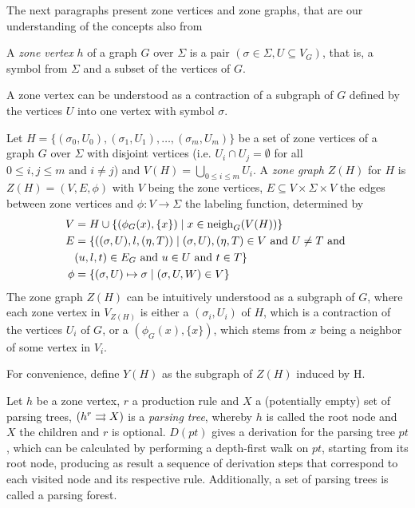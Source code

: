 The next paragraphs present zone vertices and zone graphs, that are our understanding of the concepts also from %

\begin{definition}
	\label{def:zv}
	A \emph{zone vertex} $h$ of a graph $G$ over $\Sigma$ is a pair $(\sigma \in \Sigma, U \subseteq V_G)$, that is, a symbol from $\Sigma$ and a subset of the vertices of $G$.
	
	A zone vertex can be understood as a contraction of a subgraph of $G$ defined by the vertices $U$ into one vertex with symbol $\sigma$.
\end{definition}

\begin{definition}
	\label{def:z}
	Let $H = \{(\sigma_0,U_0),(\sigma_1,U_1),\dots,(\sigma_m,U_m)\}$ be a set of zone vertices of a graph $G$ over $\Sigma$ with disjoint vertices (i.e. $U_i \cap U_j = \emptyset$ for all $0 \leq i,j \leq m \text{ and } i \neq j$) and $V(H) = \bigcup_{0 \leq i \leq m}{U_i}$. A \emph{zone graph} $Z(H)$ for $H$ is $Z(H) = (V, E, \phi)$ with $V$ being the zone vertices, $E \subseteq V \times \Sigma \times V$ the edges between zone vertices and $\phi: V \to \Sigma$ the labeling function, determined by
	\begin{align*}
		V & = H \cup \{(\phi_G(x),\{x\}) \; | \; x \in \operatorname{neigh}_{G}(V(H)) \}\\
		E & = \{((\sigma,U),l,(\eta,T)) \; | \; (\sigma,U),(\eta,T) \in V \text{ and } U \neq T \text{ and } \\
		& (u,l,t) \in E_G \text{ and } u \in U \text{ and } t \in T\} \\
		\phi & = \{(\sigma,U) \mapsto \sigma  \; | \; (\sigma,U,W) \in V\}
	\end{align*}
	The zone graph $Z(H)$ can be intuitively understood as a subgraph of $G$, where each zone vertex in $V_{Z(H)}$ is either a $(\sigma_i,U_i)$ of $H$, which is a contraction of the vertices $U_i$ of $G$, or a $(\phi_G(x),\{x\})$, which stems from $x$ being a neighbor of some vertex in $V_i$.
	
	For convenience, define $Y(H)$ as the subgraph of $Z(H)$ induced by H.
\end{definition}

\begin{definition}
	Let $h$ be a zone vertex, $r$ a production rule and $X$ a (potentially empty) set of parsing trees, $\ptree{h}{r}{X}$ is a \emph{parsing tree}, whereby $h$ is called the root node and $X$ the children and $r$ is optional. $D(pt)$ gives a derivation for the parsing tree $pt$, which can be calculated by performing a depth-first walk on $pt$, starting from its root node, producing as result a sequence of derivation steps that correspond to each visited node and its respective rule. Additionally, a set of parsing trees is called a parsing forest.
\end{definition}

